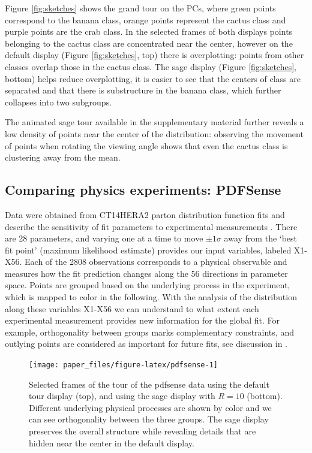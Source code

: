 \documentclass[]{interact}
\theoremstyle{plain}%
\theoremstyle{definition}
\theoremstyle{remark}
\begin{document}
Figure \ref{fig:sketches} shows the grand tour on the PCs, where green
points correspond to the banana class, orange points represent the
cactus class and purple points are the crab class. In the selected
frames of both displays points belonging to the cactus class are
concentrated near the center, however on the default display (Figure
\ref{fig:sketches}, top) there is overplotting: points from other
classes overlap those in the cactus class. The sage display (Figure
\ref{fig:sketches}, bottom) helps reduce overplotting, it is easier to
see that the centers of class are separated and that there is
substructure in the banana class, which further collapses into two
subgroups.

The animated sage tour available in the supplementary material further
reveals a low density of points near the center of the distribution:
observing the movement of points when rotating the viewing angle shows
that even the cactus class is clustering away from the mean.

\hypertarget{sec:appl3}{%
\subsection{Comparing physics experiments: PDFSense}\label{sec:appl3}}

Data were obtained from CT14HERA2 parton distribution function fits and
describe the sensitivity of fit parameters to experimental measurements
\citep{Wang:2018heo}. There are 28 parameters, and varying one at a time
to move \(\pm 1 \sigma\) away from the `best fit point' (maximum
likelihood estimate) provides our input variables, labeled X1-X56. Each
of the 2808 observations corresponds to a physical observable and
measures how the fit prediction changes along the 56 directions in
parameter space. Points are grouped based on the underlying process in
the experiment, which is mapped to color in the following. With the
analysis of the distribution along these variables X1-X56 we can
understand to what extent each experimental measurement provides new
information for the global fit. For example, orthogonality between
groups marks complementary constraints, and outlying points are
considered as important for future fits, see discussion in
\citet{Cook:2018mvr}.

\begin{figure}

{\centering \texttt{[image: paper\_files/figure-latex/pdfsense-1]} 

}

\caption{Selected frames of the tour of the pdfsense data using the default tour display (top), and using the sage display with $R=10$ (bottom). Different underlying physical processes are shown by color and we can see orthogonality between the three groups. The sage display preserves the overall structure while revealing details that are hidden near the center in the default display.}\label{fig:pdfsense}
\end{figure}
\end{document}
